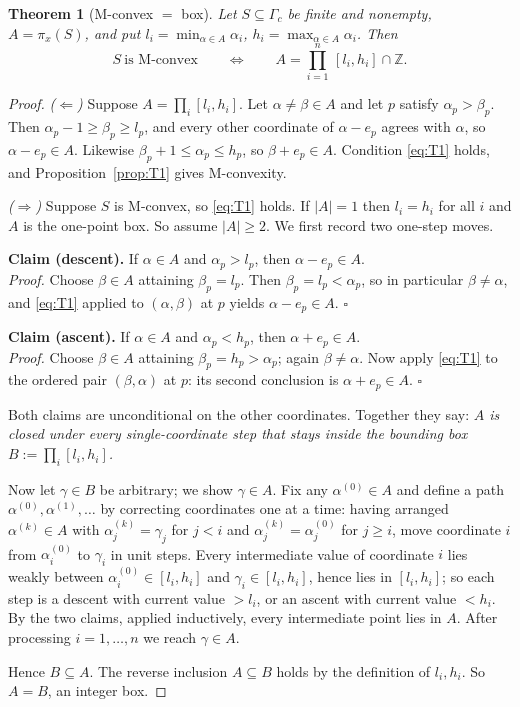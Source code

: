 \documentclass[11pt]{article}
\newtheorem{theorem}{Theorem}[section]
\theoremstyle{definition}
\newcommand{\Z}{\mathbb{Z}}
\begin{document}
\begin{theorem}[M-convex $=$ box]\label{thm:box}
Let $S\subseteq\Gamma_c$ be finite and nonempty, $A=\pi_x(S)$, and put
$l_i=\min_{\alpha\in A}\alpha_i$, $h_i=\max_{\alpha\in A}\alpha_i$. Then
\[
S\ \text{is M-convex}\qquad\Longleftrightarrow\qquad A=\prod_{i=1}^{n}\,[l_i,h_i]\cap\Z .
\]
\end{theorem}

\begin{proof}
\emph{($\Leftarrow$)} Suppose $A=\prod_i[l_i,h_i]$. Let $\alpha\ne\beta\in A$ and let
$p$ satisfy $\alpha_p>\beta_p$. Then $\alpha_p-1\ge\beta_p\ge l_p$, and every other
coordinate of $\alpha-e_p$ agrees with $\alpha$, so $\alpha-e_p\in A$. Likewise
$\beta_p+1\le\alpha_p\le h_p$, so $\beta+e_p\in A$. Condition \eqref{eq:T1} holds, and
Proposition~\ref{prop:T1} gives M-convexity.

\emph{($\Rightarrow$)} Suppose $S$ is M-convex, so \eqref{eq:T1} holds. If $|A|=1$ then
$l_i=h_i$ for all $i$ and $A$ is the one-point box. So assume $|A|\ge2$. We first record two
one-step moves.

\smallskip
\noindent\textbf{Claim (descent).} If $\alpha\in A$ and $\alpha_p>l_p$, then
$\alpha-e_p\in A$.\\
\emph{Proof.} Choose $\beta\in A$ attaining $\beta_p=l_p$. Then $\beta_p=l_p<\alpha_p$,
so in particular $\beta\ne\alpha$, and \eqref{eq:T1} applied to $(\alpha,\beta)$ at $p$
yields $\alpha-e_p\in A$. \hfill$\square$

\smallskip
\noindent\textbf{Claim (ascent).} If $\alpha\in A$ and $\alpha_p<h_p$, then
$\alpha+e_p\in A$.\\
\emph{Proof.} Choose $\beta\in A$ attaining $\beta_p=h_p>\alpha_p$; again $\beta\ne\alpha$.
Now apply \eqref{eq:T1} to the ordered pair $(\beta,\alpha)$ at $p$: its second conclusion
is $\alpha+e_p\in A$. \hfill$\square$

\smallskip
Both claims are unconditional on the other coordinates. Together they say: \emph{$A$ is
closed under every single-coordinate step that stays inside the bounding box
$B:=\prod_i[l_i,h_i]$.}

Now let $\gamma\in B$ be arbitrary; we show $\gamma\in A$. Fix any $\alpha^{(0)}\in A$ and
define a path $\alpha^{(0)},\alpha^{(1)},\dots$ by correcting coordinates one at a time:
having arranged $\alpha^{(k)}\in A$ with $\alpha^{(k)}_j=\gamma_j$ for $j<i$ and
$\alpha^{(k)}_j=\alpha^{(0)}_j$ for $j\ge i$, move coordinate $i$ from $\alpha^{(0)}_i$ to
$\gamma_i$ in unit steps. Every intermediate value of coordinate $i$ lies weakly between
$\alpha^{(0)}_i\in[l_i,h_i]$ and $\gamma_i\in[l_i,h_i]$, hence lies in $[l_i,h_i]$; so each
step is a descent with current value $>l_i$, or an ascent with current value $<h_i$. By the
two claims, applied inductively, every intermediate point lies in $A$. After processing
$i=1,\dots,n$ we reach $\gamma\in A$.

Hence $B\subseteq A$. The reverse inclusion $A\subseteq B$ holds by the definition of
$l_i,h_i$. So $A=B$, an integer box.
\end{proof}
\end{document}
